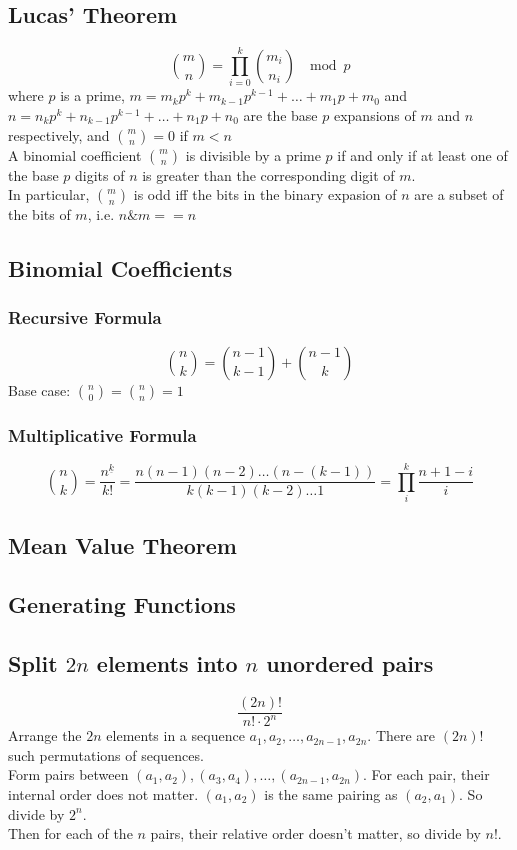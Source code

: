 \documentclass[12pt]{extarticle}
\begin{document}
\subsection*{Lucas' Theorem}
$${m\choose n}=\prod_{i=0}^{k}{m_{i}\choose n_{i}}\;\mod p$$
where $p$ is a prime, $m=m_{k}p^{k}+m_{k-1}p^{k-1}+\dots+m_{1}p+m_{0}$ and $n=n_{k}p^{k}+n_{k-1}p^{k-1}+\dots+n_{1}p+n_{0}$ are the base $p$ expansions of $m$ and $n$ respectively, and ${m\choose n}=0$ if $m<n$\\
A binomial coefficient $m\choose n$ is divisible by a prime $p$ if and only if at least one of the base $p$ digits of $n$ is greater than the corresponding digit of $m$.\\
In particular, $m\choose n$ is odd iff the bits in the binary expasion of $n$ are a subset of the bits of $m$, i.e. $n\&m==n$
\subsection*{Binomial Coefficients}
\subsubsection*{Recursive Formula}
$${n\choose k}={n-1\choose k-1}+{n-1\choose k}$$
Base case: ${n\choose 0}={n\choose n}=1$
\subsubsection*{Multiplicative Formula}
$${n\choose k}=\frac{n^{\underline{k}}}{k!}=\frac{n(n-1)(n-2)\dots(n-(k-1))}{k(k-1)(k-2)\dots 1}=\prod_{i}^{k}\frac{n+1-i}{i}$$
\subsection*{Mean Value Theorem}
\subsection*{Generating Functions}
\subsection*{Split $2n$ elements into $n$ unordered pairs}
$$\frac{(2n)!}{n!\cdot 2^{n}}$$
Arrange the $2n$ elements in a sequence $a_{1},a_{2},\dots,a_{2n-1},a_{2n}$. There are $(2n)!$ such permutations of sequences. \\
Form pairs between $(a_{1}, a_{2}), (a_{3},a_{4}),\dots,(a_{2n-1},a_{2n})$. For each pair, their internal order does not matter. $(a_{1},a_{2})$ is the same pairing as $(a_{2},a_{1})$. So divide  by $2^{n}$.\\
Then for each of the $n$ pairs, their relative order doesn't matter, so divide by $n!$.
\end{document}
